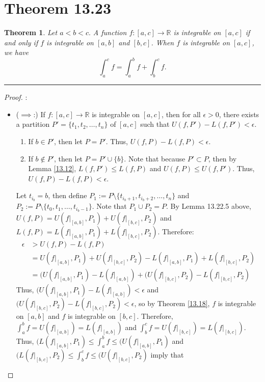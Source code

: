 \documentclass[openany, amssymb, psamsfonts]{amsart}
\newcommand{\bbR}{\mathbb{R}}
\newtheorem{thm}{Theorem}[section]
\theoremstyle{definition}
\numberwithin{equation}{section}
\begin{document}
\section*{Theorem 13.23}
\begin{thm}
\label{13.23}
	Let $a < b < c.$ A function $f\colon [a,c]\to \bbR$ is integrable on $[a, c]$ if and only if $f$ is integrable on $[a, b]$ and $[b, c]$. When $f$ is integrable on $[a, c]$, we have
	\[
		\int_{a}^{c} f = \int_{a}^{b} f + \int_{b}^{c}f.
	\]
	\bigskip
\end{thm}

\vspace{4pt}     \hrule   \vspace{4pt} \begin{proof}:\\
    \begin{itemize}
        \item ($\implies$:) If $f:[a,c] \to \bbR$ is integrable on $[a,c]$, then for all $\epsilon>0$, there exists a partition $P' = \{t_1, t_2, \dots, t_n\}$ of $[a,c]$ such that $U(f,P') - L(f,P') <\epsilon$. 
        \begin{enumerate} [i]
            \item If $b\in P'$, then let $P = P'$. Thus, $U(f,P) - L(f,P) <\epsilon.$
            \item If $b\notin P'$, then let $P = P' \cup \{b\}$. Note that because $P' \subset P$, then by Lemma \ref{13.12}, $L(f,P')\leq L(f,P)$ and $U(f,P)\leq U(f,P')$. Thus, $U(f,P) - L(f,P)< \epsilon$.
        \end{enumerate}
        Let $t_{i_b} = b$, then define $P_1:= P\setminus\{t_{i_b+1}, t_{i_b+2}, \dots, t_n\}$ and $P_2:= P\setminus\{t_0, t_1, \dots, t_{i_b-1}\}$. Note that $P_1 \cup P_2 = P$. By Lemma 13.22.5 above, $U(f,P) = U(f|_{[a,b]}, P_1) + U(f|_{[b,c]}, P_2)$ and $L(f,P) = L(f|_{[a,b]}, P_1) + L(f|_{[b,c]}, P_2)$. Therefore:
        \begin{align*}
            \epsilon&> U(f,P) - L(f,P)\\
            &= U(f|_{[a,b]}, P_1) + U(f|_{[b,c]}, P_2) - L(f|_{[a,b]}, P_1) + L(f|_{[b,c]}, P_2)\\
            &= (U(f|_{[a,b]}, P_1) - L(f|_{[a,b]}) + (U(f|_{[b,c]}, P_2) - L(f|_{[b,c]}, P_2)
        \end{align*}
        Thus, $(U(f|_{[a,b]}, P_1) - L(f|_{[a,b]}) < \epsilon$ and $(U(f|_{[b,c]}, P_2) - L(f|_{[b,c]}, P_2)< \epsilon$, so by Theorem \ref{13.18}, $f$ is integrable on $[a,b]$ and $f$ is integrable on $[b,c]$. Therefore, $\int_a^bf = U(f|_{[a,b]}) = L(f|_{[a,b]})$ and $\int_b^cf = U(f|_{[b,c]}) = L(f|_{[b,c]})$. Thus, $(L(f|_{[a,b]}, P_1)\leq \int_a^bf \leq (U(f|_{[a,b]}, P_1)$ and $(L(f|_{[b,c]}, P_2)\leq \int_b^cf \leq (U(f|_{[b,c]}, P_2)$ imply that 

\end{itemize}
\end{proof}
\end{document}
